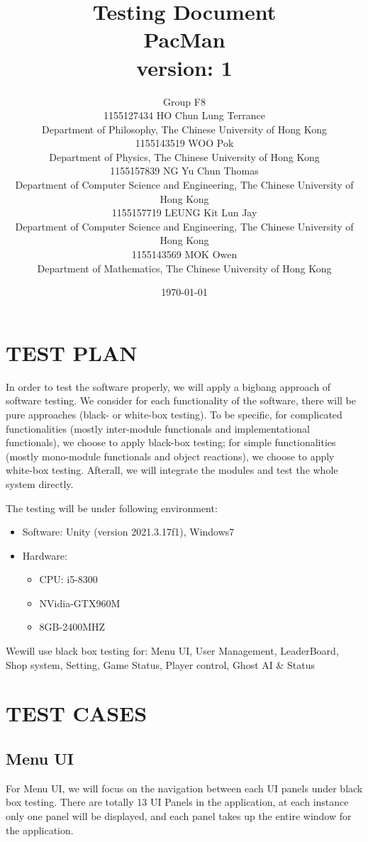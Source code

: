 \documentclass[11pt]{article}
\title{Testing Document\\PacMan\\version: 1}
\author{Group F8\\1155127434 HO Chun Lung Terrance\\
Department of Philosophy, The Chinese University of Hong Kong\\1155143519 WOO Pok\\
Department of Physics, The Chinese University of Hong Kong\\1155157839 NG Yu Chun Thomas\\
Department of Computer Science and Engineering, The Chinese University of Hong Kong\\1155157719 LEUNG Kit Lun Jay\\
Department of Computer Science and Engineering, The Chinese University of Hong Kong\\1155143569 MOK Owen\\
Department of Mathematics, The Chinese University of Hong Kong}
\date{\today}
\begin{document}
    \maketitle
    \tableofcontents
    \newpage

    \section{TEST PLAN}
    In order to test the software properly, we will apply a bigbang approach of software testing. We consider for each functionality of the software, there will be pure approaches (black- or white-box testing). To be specific, for complicated functionalities (mostly inter-module functionals and implementational functionals), we choose to apply black-box testing; for simple functionalities (mostly mono-module functionals and object reactions), we choose to apply white-box testing. Afterall, we will integrate the modules and test the whole system directly.

    The testing will be under following environment:
    \begin{itemize}
        \item Software: Unity (version 2021.3.17f1), Windows7
        \item Hardware: \begin{itemize}
            \item CPU: i5-8300
            \item NVidia-GTX960M
            \item 8GB-2400MHZ
        \end{itemize}
    \end{itemize}

    Wewill use black box testing for: Menu UI, User Management, LeaderBoard, Shop system, Setting, Game Status, Player control, Ghost AI \& Status

    \section{TEST CASES}
    
    \subsection{Menu UI}
    For Menu UI, we will focus on the navigation between each UI panels under black box testing. There are totally 13 UI Panels in the application, at each instance only one panel will be displayed, and each panel takes up the entire window for the application.
\end{document}
